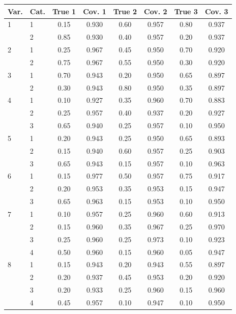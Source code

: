 \begin{table}[H]
\centering
\begin{tabular}{llcccccc}
  \toprule
\textbf{Var.} & \textbf{Cat.} & \textbf{True 1} & \textbf{Cov. 1} & \textbf{True 2} & \textbf{Cov. 2} & \textbf{True 3} & \textbf{Cov. 3} \\ 
  \midrule
1 & 1 & 0.15 & 0.930 & 0.60 & 0.957 & 0.80 & 0.937 \\ 
   & 2 & 0.85 & 0.930 & 0.40 & 0.957 & 0.20 & 0.937 \\ 
  2 & 1 & 0.25 & 0.967 & 0.45 & 0.950 & 0.70 & 0.920 \\ 
   & 2 & 0.75 & 0.967 & 0.55 & 0.950 & 0.30 & 0.920 \\ 
  3 & 1 & 0.70 & 0.943 & 0.20 & 0.950 & 0.65 & 0.897 \\ 
   & 2 & 0.30 & 0.943 & 0.80 & 0.950 & 0.35 & 0.897 \\ 
  4 & 1 & 0.10 & 0.927 & 0.35 & 0.960 & 0.70 & 0.883 \\ 
   & 2 & 0.25 & 0.957 & 0.40 & 0.937 & 0.20 & 0.927 \\ 
   & 3 & 0.65 & 0.940 & 0.25 & 0.957 & 0.10 & 0.950 \\ 
  5 & 1 & 0.20 & 0.943 & 0.25 & 0.950 & 0.65 & 0.893 \\ 
   & 2 & 0.15 & 0.940 & 0.60 & 0.957 & 0.25 & 0.903 \\ 
   & 3 & 0.65 & 0.943 & 0.15 & 0.957 & 0.10 & 0.963 \\ 
  6 & 1 & 0.15 & 0.977 & 0.50 & 0.957 & 0.75 & 0.917 \\ 
   & 2 & 0.20 & 0.953 & 0.35 & 0.953 & 0.15 & 0.947 \\ 
   & 3 & 0.65 & 0.963 & 0.15 & 0.953 & 0.10 & 0.950 \\ 
  7 & 1 & 0.10 & 0.957 & 0.25 & 0.960 & 0.60 & 0.913 \\ 
   & 2 & 0.15 & 0.960 & 0.35 & 0.967 & 0.25 & 0.970 \\ 
   & 3 & 0.25 & 0.960 & 0.25 & 0.973 & 0.10 & 0.923 \\ 
   & 4 & 0.50 & 0.960 & 0.15 & 0.960 & 0.05 & 0.947 \\ 
  8 & 1 & 0.15 & 0.943 & 0.20 & 0.943 & 0.55 & 0.897 \\ 
   & 2 & 0.20 & 0.937 & 0.45 & 0.953 & 0.20 & 0.920 \\ 
   & 3 & 0.20 & 0.933 & 0.25 & 0.960 & 0.15 & 0.960 \\ 
   & 4 & 0.45 & 0.957 & 0.10 & 0.947 & 0.10 & 0.950 \\ 

\end{tabular}
\end{table}
